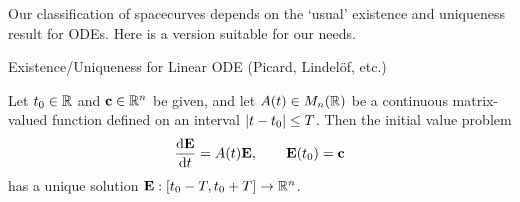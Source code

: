 Our classification of spacecurves depends on the `usual' existence and uniqueness result for ODEs. Here is a version suitable for our needs.
% 
% 
% 
% 
% 

\begin{thm}{Existence/Uniqueness for Linear ODE (Picard, Lindelöf, etc.)}{}\phantom{bob}\par
	Let $t_0\in\R$ and $\vc\in\R^n$ be given, and let $A(t)\in M_n(\R)$ be a continuous matrix-valued function defined on an interval $\nm{t-t_0}\le T$. Then the initial value problem
	\[
		\diff[\vE]{t}=A(t)\vE,\qquad \vE(t_0)=\vc
	\]
	has a unique solution $\vE:[t_0-T,t_0+T]\to \R^n$.
\end{thm}

